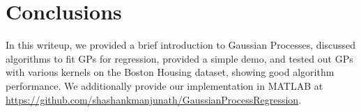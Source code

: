 \documentclass{article}
\begin{document}
\section{Conclusions}

In this writeup, we provided a brief introduction to Gaussian Processes, discussed algorithms to fit GPs for regression,
provided a simple demo, and tested out GPs with various kernels on the Boston Housing dataset, showing good algorithm
performance. We additionally provide our implementation in MATLAB at
\href{https://github.com/shashankmanjunath/GaussianProcessRegression}{https://github.com/shashankmanjunath/GaussianProcessRegression}.



\end{document}
